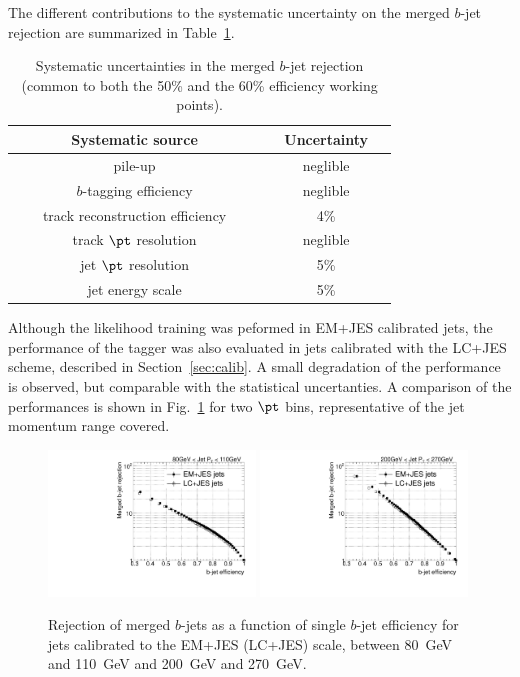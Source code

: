 \vspace{3mm}
The different contributions to the systematic uncertainty on the merged $b$-jet rejection are summarized in Table~\ref{tb:systematics}.
\begin{table}[!hbt] %
\renewcommand{\arraystretch}{1.2}
\centering
\begin{tabular}{ | c | c |}
\hline
  ~~~~~~~Systematic source~~~~~~~ &~~Uncertainty~~\\ \hline
  pile-up          &  neglible     \\ 
  $b$-tagging efficiency     &  neglible     \\ 
  track reconstruction efficiency  &    4\%        \\ 
  track $\pt$ resolution &  neglible     \\
  jet $\pt$ resolution  &    5\%        \\  
  jet energy scale  &    5\%        \\ \hline 
\end{tabular}
\caption{Systematic uncertainties in the merged $b$-jet rejection (common to both the 50\% and the 60\% efficiency working points).}
\label{tb:systematics}
\end{table}


Although the likelihood training was peformed in EM+JES calibrated jets, the performance of the tagger was also evaluated in jets calibrated with the LC+JES scheme, described in Section~\ref{sec:calib}.  A small degradation of the performance is observed, but comparable with the statistical uncertanties. A comparison of the performances is shown in Fig.~\ref{fig:LCJES} for two $\pt$ bins, representative of the jet momentum range covered. 

\begin{figure}[tp]
\centering
\includegraphics[width=0.49\textwidth]{FIGS/systematics/LlhoodKDE_ISO_LCcalibTest_rejvseff080.pdf}
\includegraphics[width=0.49\textwidth]{FIGS/systematics/LlhoodKDE_ISO_LCcalibTest_rejvseff200.pdf}
\caption{Rejection of merged $b$-jets as a function of single $b$-jet efficiency for jets calibrated to the EM+JES (LC+JES) scale, between 80~GeV and 110~GeV and 200~GeV and 270~GeV.}
\label{fig:LCJES}
\end{figure}

